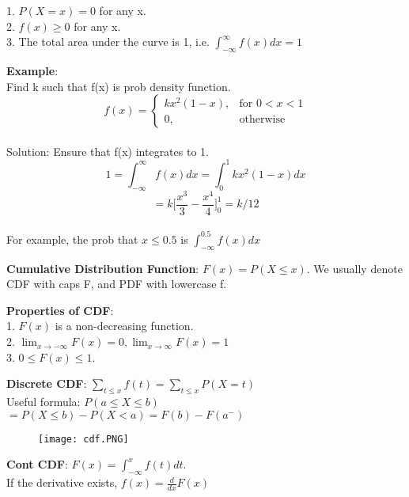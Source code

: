 \documentclass[a4paper,landscape]{article}
\newcommand{\rnname}[1]{\textbf{#1}}
\begin{document}
\begin{multicols*}{4}
\begin{flatitemize}
1. $P(X = x) = 0$ for any x. \\
2. $f(x) \geq 0 $ for any x. \\
3. The total area under the curve is 1, i.e. $\int_{-\infty}^{\infty} f(x) dx = 1$
\item \rnname{Example}: \\
Find k such that f(x) is prob density function. \\
$$f(x) = 
\begin{cases}
    kx^2(1-x),& \text{for } 0 < x < 1\\
    0,              & \text{otherwise}
\end{cases}$$ \\
Solution: Ensure that f(x) integrates to 1.
$$ 1 = \int_{-\infty}^{\infty}f(x) dx = \int_{0}^{1}kx^2(1-x) dx $$
$$
= k \big[ \frac{x^3}{3} - \frac{x^4}{4} \big]_{0}^{1} = k/12 $$
\\
For example, the prob that $x \leq 0.5$ is $\int_{-\infty}^{0.5}f(x) dx$
\item \rnname{Cumulative Distribution Function}: $F(x) = P(X \leq x)$. We usually denote CDF with caps F, and PDF with lowercase f.
\item \rnname{Properties of CDF}: \\
1. $F(x)$ is a non-decreasing function. \\
2. $\lim_{x \rightarrow -\infty} F(x) = 0, \lim_{x \rightarrow \infty} F(x) = 1$\\
3. $ 0 \leq F(x) \leq 1$. \\
\item \rnname{Discrete CDF}: $\sum_{t \leq x}f(t) = \sum_{t \leq x}P(X=t)$ \\
Useful formula: $P(a \leq X \leq b)$ \\
$= P(X \leq b) - P(X < a) = F(b) - F(a^-)$ \\
\vspace{-0.4cm}
    \begin{figure}[H]
      \texttt{[image: cdf.PNG]}
    \end{figure}
\vspace{-0.4cm}
\item \rnname{Cont CDF}: $F(x) = \int_{-\infty}^{x} f(t) dt$. \\
If the derivative exists, $f(x) = \frac{d}{dx} F(x) $
\end{flatitemize}



\end{multicols*}
\end{document}
